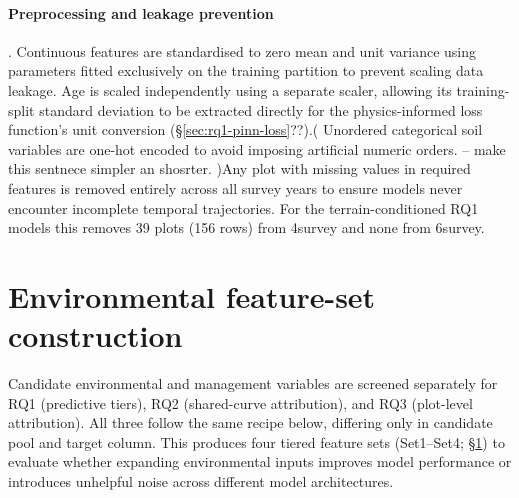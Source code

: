 \paragraph*{Preprocessing and leakage prevention}. Continuous features are standardised to zero mean and unit variance using parameters fitted exclusively on the training partition to prevent scaling data leakage. Age is scaled independently using a separate scaler, allowing its training-split standard deviation to be extracted directly for the physics-informed loss function's unit conversion (\S\ref{sec:rq1-pinn-loss}??).( Unordered categorical soil variables are one-hot encoded to avoid imposing artificial numeric orders.  -- make this sentnece simpler an shosrter. )Any plot with missing values in required features is removed entirely across all survey years to ensure models never encounter incomplete temporal trajectories. For the terrain-conditioned RQ1 models this removes 39 plots (156 rows) from 4survey and none from 6survey. 

\section{Environmental feature-set construction}
\label{sec:feature-final}
Candidate environmental and management variables are screened separately for RQ1 (predictive tiers), RQ2 (shared-curve attribution), and RQ3 (plot-level attribution). All three follow the same recipe below, differing only in candidate pool and
target column. This produces four tiered feature sets (Set1–Set4; \S\ref{sec:feature-final}) to evaluate whether expanding environmental inputs improves model performance or introduces unhelpful noise across different model architectures.

